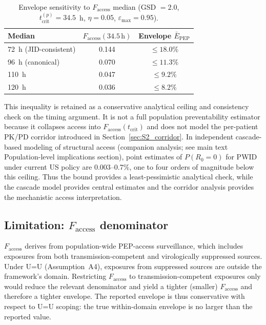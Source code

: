 \documentclass[11pt]{article}
\theoremstyle{definition}
\theoremstyle{remark}
\newcommand{\Ebarpep}{\bar{E}_{\text{PEP}}}
\newcommand{\Faccess}{F_{\text{access}}}
\newcommand{\tcrit}{t_{\text{crit}}}
\newcommand{\emax}{\varepsilon_{\max}}
\begin{document}
\begin{table}[H]
\centering
\small
\caption{Envelope sensitivity to $\Faccess$ median (GSD $= 2.0$, $\tcrit^{(p)} = 34.5$~h, $\eta = 0.05$, $\emax = 0.95$).}
\begin{tabular}{@{}lcc@{}}
\toprule
\textbf{Median} & \textbf{$\Faccess(34.5\,\text{h})$} & \textbf{Envelope $\Ebarpep$} \\
\midrule
72~h (JID-consistent) & 0.144 & $\leq 18.0\%$ \\
96~h (canonical)      & 0.070 & $\leq 11.3\%$ \\
110~h                 & 0.047 & $\leq 9.2\%$  \\
120~h                 & 0.036 & $\leq 8.2\%$  \\
\bottomrule
\end{tabular}
\end{table}

This inequality is retained as a conservative analytical ceiling and consistency check on the timing argument. It is not a full population preventability estimator because it collapses access into $\Faccess(\tcrit)$ and does not model the per-patient PK/PD corridor introduced in Section~\ref{sec:S2_corridor}. In independent cascade-based modeling of structural access (companion analysis; see main text Population-level implications section), point estimates of $P(R_{0}=0)$ for PWID under current US policy are 0.003--0.7\%, one to four orders of magnitude below this ceiling. Thus the bound provides a least-pessimistic analytical check, while the cascade model provides central estimates and the corridor analysis provides the mechanistic access interpretation.

\subsection{Limitation: \texorpdfstring{$\Faccess$}{Faccess} denominator}

$\Faccess$ derives from population-wide PEP-access surveillance, which includes exposures from both transmission-competent and virologically suppressed sources. Under U=U (Assumption~A4), exposures from suppressed sources are outside the framework's domain. Restricting $\Faccess$ to transmission-competent exposures only would reduce the relevant denominator and yield a tighter (smaller) $\Faccess$ and therefore a tighter envelope. The reported envelope is thus conservative with respect to U=U scoping: the true within-domain envelope is no larger than the reported value.
\end{document}
